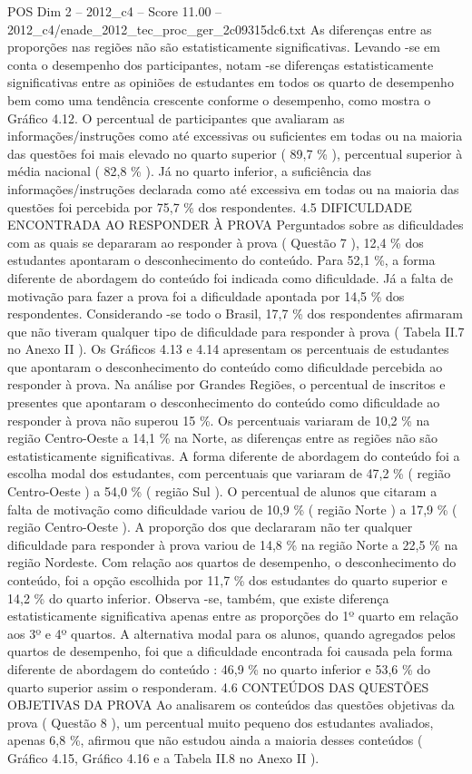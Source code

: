 \begin{textsample}{POS Dim 2 – 2012\_c4 – Score 11.00 – 2012\_c4/enade\_2012\_tec\_proc\_ger\_2c09315dc6.txt}
As diferenças entre as proporções nas regiões não são estatisticamente significativas.
Levando -se em conta o desempenho dos participantes, notam -se diferenças estatisticamente significativas entre as opiniões de estudantes em todos os quarto de desempenho bem como uma tendência crescente conforme o desempenho, como mostra o Gráfico 4.12.
O percentual de participantes que avaliaram as informações/instruções como até excessivas ou suficientes em todas ou na maioria das questões foi mais elevado no quarto superior ( 89,7 \% ), percentual superior à média nacional ( 82,8 \% ).
Já no quarto inferior, a suficiência das informações/instruções declarada como até excessiva em todas ou na maioria das questões foi percebida por 75,7 \% dos respondentes. 4.5 DIFICULDADE ENCONTRADA AO RESPONDER À PROVA Perguntados sobre as dificuldades com as quais se depararam ao responder à prova ( Questão 7 ), 12,4 \% dos estudantes apontaram o desconhecimento do conteúdo.
Para 52,1 \%, a forma diferente de abordagem do conteúdo foi indicada como dificuldade.
Já a falta de motivação para fazer a prova foi a dificuldade apontada por 14,5 \% dos respondentes.
Considerando -se todo o Brasil, 17,7 \% dos respondentes afirmaram que não tiveram qualquer tipo de dificuldade para responder à prova ( Tabela II.7 no Anexo II ).
Os Gráficos 4.13 e 4.14 apresentam os percentuais de estudantes que apontaram o desconhecimento do conteúdo como dificuldade percebida ao responder à prova.
Na análise por Grandes Regiões, o percentual de inscritos e presentes que apontaram o desconhecimento do conteúdo como dificuldade ao responder à prova não superou 15 \%.
Os percentuais variaram de 10,2 \% na região Centro-Oeste a 14,1 \% na Norte, as diferenças entre as regiões não são estatisticamente significativas.
A forma diferente de abordagem do conteúdo foi a escolha modal dos estudantes, com percentuais que variaram de 47,2 \% ( região Centro-Oeste ) a 54,0 \% ( região Sul ).
O percentual de alunos que citaram a falta de motivação como dificuldade variou de 10,9 \% ( região Norte ) a 17,9 \% ( região Centro-Oeste ).
A proporção dos que declararam não ter qualquer dificuldade para responder à prova variou de 14,8 \% na região Norte a 22,5 \% na região Nordeste.
Com relação aos quartos de desempenho, o desconhecimento do conteúdo, foi a opção escolhida por 11,7 \% dos estudantes do quarto superior e 14,2 \% do quarto inferior.
Observa -se, também, que existe diferença estatisticamente significativa apenas entre as proporções do 1º quarto em relação aos 3º e 4º quartos.
A alternativa modal para os alunos, quando agregados pelos quartos de desempenho, foi que a dificuldade encontrada foi causada pela forma diferente de abordagem do conteúdo : 46,9 \% no quarto inferior e 53,6 \% do quarto superior assim o responderam. 4.6 CONTEÚDOS DAS QUESTÕES OBJETIVAS DA PROVA Ao analisarem os conteúdos das questões objetivas da prova ( Questão 8 ), um percentual muito pequeno dos estudantes avaliados, apenas 6,8 \%, afirmou que não estudou ainda a maioria desses conteúdos ( Gráfico 4.15, Gráfico 4.16 e a Tabela II.8 no Anexo II ).

\end{textsample}
